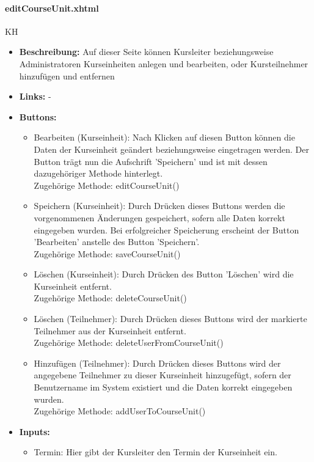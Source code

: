 				\paragraph{editCourseUnit.xhtml}
					KH\\
					\begin{itemize}
						\item \textbf{Beschreibung:} Auf dieser Seite können Kursleiter beziehungsweise Administratoren Kurseinheiten anlegen und bearbeiten, oder Kursteilnehmer hinzufügen und entfernen
						\item \textbf{Links:} -
						\item \textbf{Buttons:}
							\begin{itemize}
								\item Bearbeiten (Kurseinheit): Nach Klicken auf diesen Button können die Daten der Kurseinheit geändert beziehungsweise eingetragen werden. Der Button trägt nun die Aufschrift 'Speichern' und ist mit dessen dazugehöriger Methode hinterlegt. \\ Zugehörige Methode: editCourseUnit()
								\item Speichern (Kurseinheit): Durch Drücken dieses Buttons werden die vorgenommenen Änderungen gespeichert, sofern alle Daten korrekt eingegeben wurden. Bei erfolgreicher Speicherung erscheint der Button 'Bearbeiten' anstelle des Button 'Speichern'. \\ Zugehörige Methode: saveCourseUnit()
								\item Löschen (Kurseinheit): Durch Drücken des Button 'Löschen' wird die Kurseinheit entfernt. \\ Zugehörige Methode: deleteCourseUnit()
								\item Löschen (Teilnehmer): Durch Drücken dieses Buttons wird der markierte Teilnehmer aus der Kurseinheit entfernt. \\ Zugehörige Methode: deleteUserFromCourseUnit()
								\item Hinzufügen (Teilnehmer): Durch Drücken dieses Buttons wird der angegebene Teilnehmer zu dieser Kurseinheit hinzugefügt, sofern der Benutzername im System existiert und die Daten korrekt eingegeben wurden. \\ Zugehörige Methode: addUserToCourseUnit()
							\end{itemize}
						\item \textbf{Inputs:}
							\begin{itemize}
								\item Termin: Hier gibt der Kursleiter den Termin der Kurseinheit ein.

\end{itemize}
\end{itemize}
